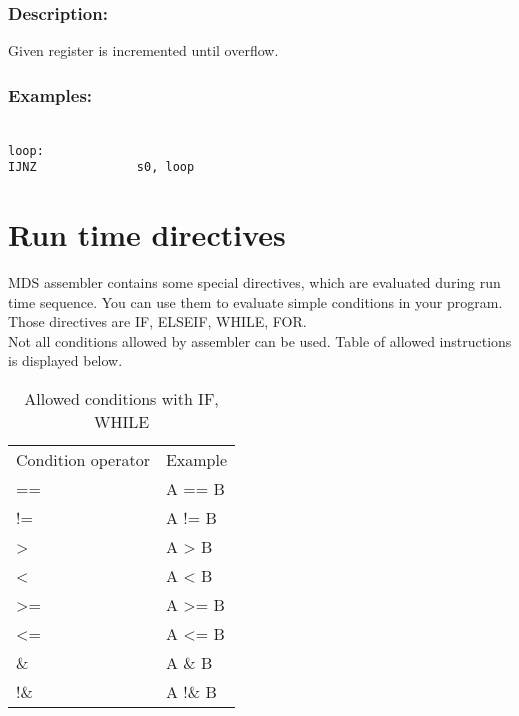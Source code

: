         \subsubsection{Description:}
            Given register is incremented until overflow.

        \subsubsection{Examples:}
        {
            ~\\
            \usecodefont
            \verb'loop:             '\\
            \verb'IJNZ              s0, loop'\\
        }

    \section{Run time directives}
    MDS assembler contains some special directives, which are evaluated during run time sequence. You can use them to evaluate simple conditions in your program.
    Those directives are IF, ELSEIF, WHILE, FOR.\\ Not all conditions allowed by assembler can be used.
    Table of allowed instructions is displayed below.
        \begin{table}[h!]
                \mysmallfont{}
                \centering{}
                \begin{tabular}{|l|l}
                \hline
                Condition operator       &          Example  \\
                ==                       &          A ==  B  \\
                !=                       &          A !=  B  \\
                >                        &          A >   B  \\
                <                        &          A <   B  \\
                >=                       &          A >=  B  \\
                <=                       &          A <=  B  \\
                \&                       &          A \&  B  \\
                !\&                      &          A !\& B
                \end{tabular}
                \caption{Allowed conditions with IF, WHILE}
        \end{table}

